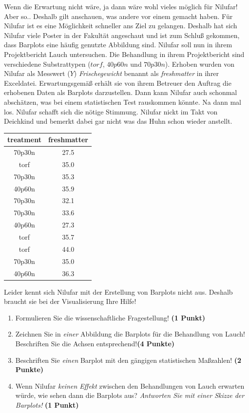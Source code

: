 \documentclass[a4paper, 9pt]{scrartcl}\usepackage[]{graphicx}\usepackage[]{xcolor}
\begin{document}
Wenn die Erwartung nicht wäre, ja dann wäre wohl vieles möglich für Nilufar! Aber so.. Deshalb gilt anschauen, was andere vor einem gemacht haben. Für Nilufar ist es eine Möglichkeit schneller ans Ziel zu gelangen. Deshalb hat sich Nilufar viele Poster in der Fakultät angeschaut und ist zum Schluß gekommen, dass Barplots eine häufig genutzte Abbildung sind. Nilufar soll nun in ihrem Projektbericht Lauch untersuchen. Die Behandlung in ihrem Projektbericht sind verschiedene Substrattypen ($torf$, $40p60n$ und $70p30n$). Erhoben wurden von Nilufar als Messwert ($Y$) \textit{Frischegewicht} benannt als \textit{freshmatter} in ihrer Exceldatei. Erwartungsgemäß erhält sie von ihrem Betreuer den Auftrag die erhobenen Daten als Barplots darzustellen. Dann kann Nilufar auch schonmal abschätzen, was bei einem statistischen Test rauskommen könnte. Na dann mal los. Nilufar schafft sich die nötige Stimmung. Nilufar nickt im Takt von Deichkind und bemerkt dabei gar nicht was das Huhn schon wieder anstellt.

\begin{table}[!h]
\centering
\begin{tabular}{cc}
\toprule
treatment & freshmatter\\
\midrule
70p30n & 27.5\\
torf & 35.0\\
70p30n & 35.3\\
40p60n & 35.9\\
70p30n & 32.1\\
\addlinespace
70p30n & 33.6\\
40p60n & 27.3\\
torf & 35.7\\
torf & 44.0\\
70p30n & 35.0\\
\addlinespace
40p60n & 36.3\\
\bottomrule
\end{tabular}
\end{table}



Leider kennt sich Nilufar mit der Erstellung von Barplots nicht aus. Deshalb braucht sie bei der Visualisierung Ihre Hilfe!

\begin{enumerate}
\item Formulieren Sie die wissenschaftliche Fragestellung! \textbf{(1 Punkt)}
\item Zeichnen Sie in \textit{einer} Abbildung die Barplots für die Behandlung von Lauch! Beschriften Sie die Achsen entsprechend!\textbf{(4 Punkte)}
\item Beschriften Sie \textit{einen} Barplot mit den gängigen statistischen Maßzahlen! \textbf{(2 Punkte)}
\item Wenn Nilufar \textit{keinen Effekt} zwischen den Behandlungen von Lauch erwarten würde, wie sehen dann die Barplots aus? \textit{Antworten Sie mit einer Skizze der Barplots!}
  \textbf{(1 Punkt)}
\end{enumerate} 
\clearpage
\end{document}
